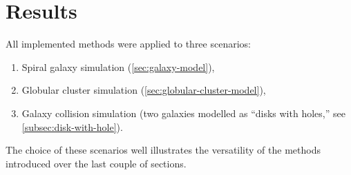 \chapter{Results}
All implemented methods were applied to three scenarios:
\begin{enumerate}
    \item Spiral galaxy simulation (\autoref{sec:galaxy-model}),
    \item Globular cluster simulation (\autoref{sec:globular-cluster-model}),
    \item Galaxy collision simulation (two galaxies modelled as ``disks with holes,'' see \autoref{subsec:disk-with-hole}).
\end{enumerate}
The choice of these scenarios well illustrates the versatility of the methods introduced over the last couple of sections.




